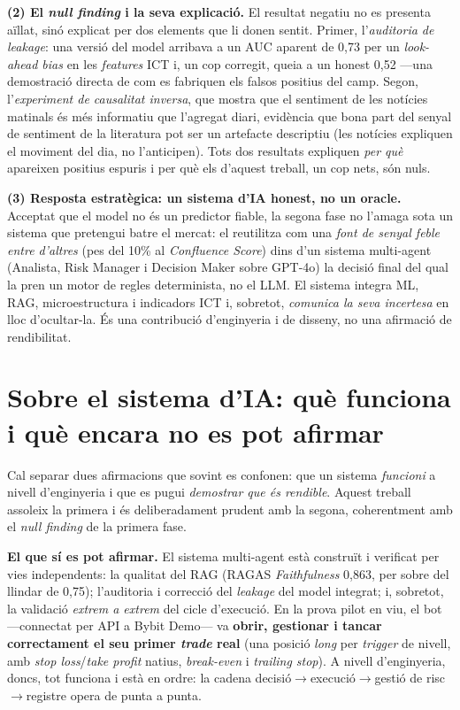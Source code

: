 \documentclass[12pt, a4paper]{report}
\begin{document}
\textbf{(2) El \textit{null finding} i la seva explicació.} El resultat negatiu no es presenta aïllat, sinó explicat per dos elements que li donen sentit. Primer, l'\emph{auditoria de leakage}: una versió del model arribava a un AUC aparent de 0,73 per un \textit{look-ahead bias} en les \textit{features} ICT i, un cop corregit, queia a un honest 0,52 ---una demostració directa de com es fabriquen els falsos positius del camp. Segon, l'\emph{experiment de causalitat inversa}, que mostra que el sentiment de les notícies matinals és més informatiu que l'agregat diari, evidència que bona part del senyal de sentiment de la literatura pot ser un artefacte descriptiu (les notícies expliquen el moviment del dia, no l'anticipen). Tots dos resultats expliquen \emph{per què} apareixen positius espuris i per què els d'aquest treball, un cop nets, són nuls.

\textbf{(3) Resposta estratègica: un sistema d'IA honest, no un oracle.} Acceptat que el model no és un predictor fiable, la segona fase no l'amaga sota un sistema que pretengui batre el mercat: el reutilitza com una \emph{font de senyal feble entre d'altres} (pes del 10\% al \textit{Confluence Score}) dins d'un sistema multi-agent (Analista, Risk Manager i Decision Maker sobre GPT-4o) la decisió final del qual la pren un motor de regles determinista, no el LLM. El sistema integra ML, RAG, microestructura i indicadors ICT i, sobretot, \emph{comunica la seva incertesa} en lloc d'ocultar-la. És una contribució d'enginyeria i de disseny, no una afirmació de rendibilitat.

\section{Sobre el sistema d'IA: què funciona i què encara no es pot afirmar}
\label{sec:concl-agent}

Cal separar dues afirmacions que sovint es confonen: que un sistema \emph{funcioni} a nivell d'enginyeria i que es pugui \emph{demostrar que és rendible}. Aquest treball assoleix la primera i és deliberadament prudent amb la segona, coherentment amb el \textit{null finding} de la primera fase.

\textbf{El que sí es pot afirmar.} El sistema multi-agent està construït i verificat per vies independents: la qualitat del RAG (RAGAS \textit{Faithfulness} 0,863, per sobre del llindar de 0,75); l'auditoria i correcció del \textit{leakage} del model integrat; i, sobretot, la validació \emph{extrem a extrem} del cicle d'execució. En la prova pilot en viu, el bot ---connectat per API a Bybit Demo--- va \textbf{obrir, gestionar i tancar correctament el seu primer \textit{trade} real} (una posició \textit{long} per \textit{trigger} de nivell, amb \textit{stop loss}/\textit{take profit} natius, \textit{break-even} i \textit{trailing stop}). A nivell d'enginyeria, doncs, tot funciona i està en ordre: la cadena decisió$\to$execució$\to$gestió de risc$\to$registre opera de punta a punta.
\end{document}
